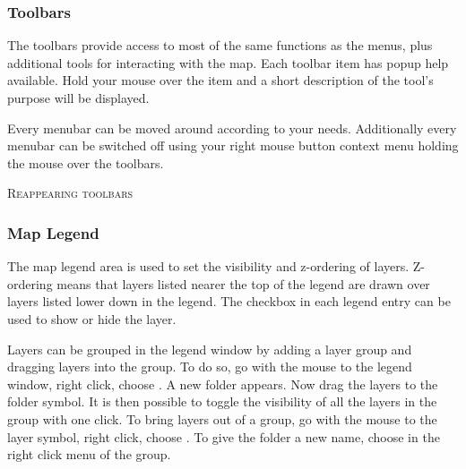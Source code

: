 
\subsubsection{Toolbars}\label{label_toolbars}

The toolbars provide access to most of the same functions as the menus,
plus additional tools for interacting with the map. Each toolbar item has
popup help available. Hold your mouse over the item and a short description of
the tool's purpose will be displayed. 

Every menubar can be moved around according to your needs. Additionally every
menubar can be switched off using your right mouse button context menu holding
the mouse over the toolbars.

\begin{Tip}
\caption{\textsc{Reappearing toolbars}} 
\end{Tip}

\subsubsection{Map Legend}\label{label_legend}

The map legend area is used to set the visibility and z-ordering of layers.
Z-ordering means that layers listed nearer the top of the legend are drawn
over layers listed lower down in the legend. The checkbox in each legend
entry can be used to show or hide the layer.

Layers can be grouped in the legend window by adding a layer group and dragging layers 
into the group. To do so, go with the mouse to the legend window, right click, choose . 
A new folder appears. Now drag the layers to the folder symbol. It is then possible to toggle the 
visibility of all the layers in the group with one click. To bring layers out of a group, go with 
the mouse to the layer symbol, right click, choose . To give the folder a 
new name, choose  in the right click menu of the group.

